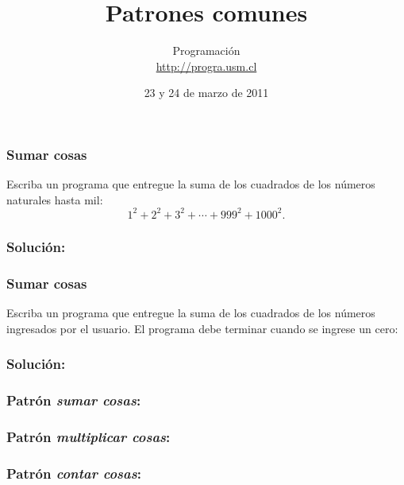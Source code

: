 \documentclass[12pt]{beamer}
\title{Patrones comunes}
\author{
  Programación \\ \url{http://progra.usm.cl}
}
\date{23 y 24 de marzo de 2011}
\begin{document}
  \begin{frame}
    \maketitle
  \end{frame}

  \begin{frame}
    \frametitle{Sumar cosas}
    \label{problema-suma-cuadrados-menores-que-mil}
    Escriba un programa que entregue la suma
    de los cuadrados de los números naturales hasta mil:
    \[
      1^2 + 2^2 + 3^2 + \cdots + 999^2 + 1000^2.
    \]
  \end{frame}

  \begin{frame}
    \frametitle{Solución:}
    \label{solucion-suma-cuadrados-menores-que-mil}
    
  \end{frame}

  \begin{frame}
    \frametitle{Sumar cosas}
    \label{problema-suma-cuadrados-hasta-cero}
    Escriba un programa que entregue la suma
    de los cuadrados de los números ingresados por el usuario.
    El programa debe terminar
    cuando se ingrese un cero:
    
  \end{frame}

  \begin{frame}
    \frametitle{Solución:}
    \label{solucion-suma-cuadrados-hasta-cero}
    
  \end{frame}

  \begin{frame}
    \frametitle{Patrón \emph{sumar cosas}:}
    \label{patron-sumar}
    
  \end{frame}

  \begin{frame}
    \frametitle{Patrón \emph{multiplicar cosas}:}
    \label{patron-multiplicar}
    
  \end{frame}

  \begin{frame}
    \frametitle{Patrón \emph{contar cosas}:}
    \label{patron-contar}
    
  \end{frame}
\end{document}
